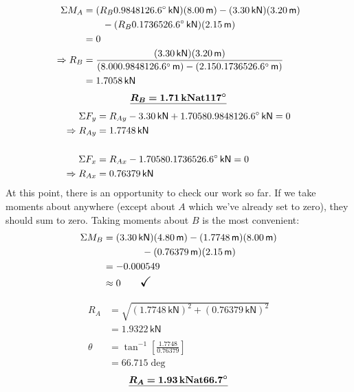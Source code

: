 \documentclass[10pt,oneside]{article}
\begin{document}
\begin{textblock*}{3.5in}
{  }

  \begin{align*}
				\Sigma M_A & = (R_B 0.98481 26.6^\circ\,\mathsf{kN}) (8.00\,\mathsf{m})-(3.30\,\mathsf{kN})(3.20\,\mathsf{m})                        \\
				          & \qquad -(R_B 0.17365 26.6^\circ\,\mathsf{kN}) (2.15\,\mathsf{m}) \\
				          & = 0 \\
				\Rightarrow R_B & = \frac{(3.30\,\mathsf{kN})(3.20\,\mathsf{m})}{(8.000.98481 26.6^\circ\,\mathsf{m})-(2.150.17365 26.6^\circ\,\mathsf{m})} \\
				                & = 1.7058\,\mathsf{kN}
			\end{align*}\Large
      $$\underline{ \bm{R_B=1.71\,\mathsf{\bf kN at }117^\circ}}$$
      \normalsize
      \begin{align*}
        \Sigma F_y & = R_{Ay}-3.30\,\mathsf{kN}+1.70580.98481 26.6^\circ\,\mathsf{kN} = 0 \\
				\Rightarrow R_{Ay} & = 1.7748\,\mathsf{kN}  \\\\
				\Sigma F_x & = R_{Ax}-1.70580.17365 26.6^\circ\,\mathsf{kN} = 0 \\
				\Rightarrow R_{Ax} & = 0.76379\,\mathsf{kN}
      \end{align*}
      At this point, there is an opportunity to check our work so far. If we take moments about anywhere (except about $A$ which we've already set to zero), they should sum to zero. Taking moments about $B$ is the most convenient:
      \begin{align*}
				\Sigma M_B & = (3.30\,\mathsf{kN})(4.80\,\mathsf{m})-(1.7748\,\mathsf{m})(8.00\,\mathsf{m}) \\
				           & \qquad\qquad-(0.76379\,\mathsf{m})(2.15\,\mathsf{m})                       \\
				           & = -0.000549                                                            \\
				           & \approx 0 \qquad\mathsf{\Large \checkmark}
			\end{align*}

      \begin{align*}
				R_A    & = \sqrt{(1.7748\,\mathsf{kN})^2+(0.76379\,\mathsf{kN})^2} \\
				       & = 1.9322\,\mathsf{kN}                                   \\\\
				\theta & = \tan^{-1}\left[\frac{1.7748}{0.76379}\right]        \\
				       & = 66.715\deg
			\end{align*}
      \Large
      $$ \underline{\bm{R_A=1.93\,\mathsf{\bf kN at }66.7^\circ}}$$

\end{textblock*}
\end{document}
